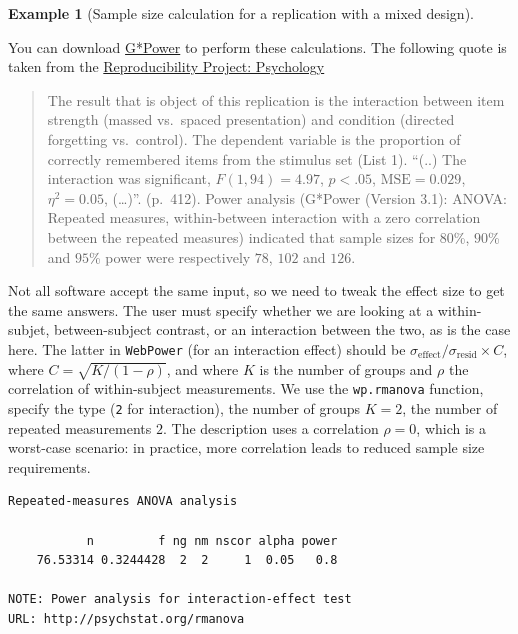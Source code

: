 \documentclass[
  11pt,
  letterpaper,
]{scrbook}
\theoremstyle{definition}
\newtheorem{example}{Example}[chapter]
\theoremstyle{definition}
\theoremstyle{remark}
\begin{document}
\begin{example}[Sample size calculation for a replication with a mixed
design]\protect\hypertarget{exm-power4}{}\label{exm-power4}

You can download
\href{https://www.psychologie.hhu.de/arbeitsgruppen/allgemeine-psychologie-und-arbeitspsychologie/gpower}{G*Power}
to perform these calculations. The following quote is taken from the
\href{https://osf.io/ezcuj/}{Reproducibility Project: Psychology}

\begin{quote}
The result that is object of this replication is the interaction between
item strength (massed vs.~spaced presentation) and condition (directed
forgetting vs.~control). The dependent variable is the proportion of
correctly remembered items from the stimulus set (List 1). ``(..) The
interaction was significant, \(F(1,94)=4.97\), \(p <.05\),
\(\mathrm{MSE} =0.029\), \(\eta^2=0.05\), (\ldots)''. (p.~412). Power
analysis (G*Power (Version 3.1): ANOVA: Repeated measures,
within-between interaction with a zero correlation between the repeated
measures) indicated that sample sizes for \(80\)\%, \(90\)\% and
\(95\)\% power were respectively \(78\), \(102\) and \(126\).
\end{quote}

Not all software accept the same input, so we need to tweak the effect
size to get the same answers. The user must specify whether we are
looking at a within-subjet, between-subject contrast, or an interaction
between the two, as is the case here. The latter in \texttt{WebPower}
(for an interaction effect) should be
\(\sigma_{\text{effect}}/\sigma_{\text{resid}}  \times C\), where
\(C = \sqrt{K/(1-\rho)}\), and where \(K\) is the number of groups and
\(\rho\) the correlation of within-subject measurements. We use the
\texttt{wp.rmanova} function, specify the type (\texttt{2} for
interaction), the number of groups \(K=2\), the number of repeated
measurements \(2\). The description uses a correlation \(\rho=0\), which
is a worst-case scenario: in practice, more correlation leads to reduced
sample size requirements.

\begin{verbatim}
Repeated-measures ANOVA analysis

           n         f ng nm nscor alpha power
    76.53314 0.3244428  2  2     1  0.05   0.8

NOTE: Power analysis for interaction-effect test
URL: http://psychstat.org/rmanova
\end{verbatim}


\end{example}
\end{document}
